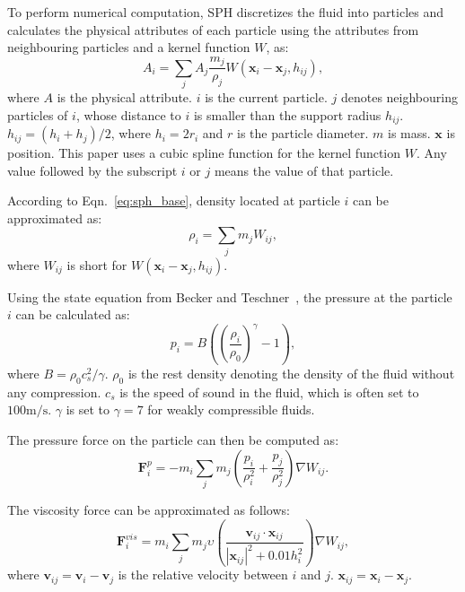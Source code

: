 \documentclass[VANCOUVER,STIX1COL]{WileyNJD-v2}
\begin{document}
To perform numerical computation, SPH discretizes the fluid into particles and calculates the physical attributes of each particle using the attributes from neighbouring particles and a kernel function $W$, as:
\begin{equation}
    A_i = \sum_j A_j \frac{m_j}{\rho_j} W(\mathbf{x}_i - \mathbf{x}_j, h_{ij}),
    \label{eq:sph_base}
\end{equation}
where $A$ is the physical attribute. $i$ is the current particle. $j$ denotes neighbouring particles of $i$, whose distance to $i$ is smaller than the support radius $h_{ij}$. $h_{ij} = (h_i + h_j) / 2$, where $h_i = 2r_i$ and $r$ is the particle diameter. $m$ is mass. $\mathbf{x}$ is position. This paper uses a cubic spline function for the kernel function $W$. Any value followed by the subscript $i$ or $j$ means the value of that particle.

According to Eqn.~\ref{eq:sph_base}, density located at particle $i$ can be approximated as:
\begin{equation}
    \rho_i = \sum_j m_j W_{ij},
    \label{eq:sph_density}
\end{equation}
where $W_{ij}$ is short for $W(\mathbf{x}_i - \mathbf{x}_j, h_{ij})$.

Using the state equation from Becker and Teschner~\cite{Becker07}, the pressure at the particle $i$ can be calculated as:
\begin{equation}
    p_i = B\left(\left(\frac{\rho_i}{\rho_0}\right)^\gamma - 1\right),
\end{equation}
where $B = \rho_0 c_s^2 / \gamma$. $\rho_0$ is the rest density denoting the density of the fluid without any compression. $c_s$ is the speed of sound in the fluid, which is often set to $100\textrm{m}/\textrm{s}$. $\gamma$ is set to $\gamma = 7$ for weakly compressible fluids.

The pressure force on the particle can then be computed as:
\begin{equation}
    \mathbf{F}_i^p = -m_i \sum_j m_j \left(
    \frac{p_i}{\rho_i^2} + \frac{p_j}{\rho_j^2}
    \right)\nabla W_{ij}.
\end{equation}

The viscosity force can be approximated as follows:
\begin{equation}
    \mathbf{F}_i^{vis} = 
    m_i \sum_j m_j \upsilon \left(\frac{\mathbf{v}_{ij}\cdot\mathbf{x}_{ij}}{|\mathbf{x}_{ij}|^2 + 0.01h_i^2}\right)\nabla W_{ij},
    \label{eq:vis}
\end{equation}
where $\mathbf{v}_{ij} = \mathbf{v}_i - \mathbf{v}_j$ is the relative velocity between $i$ and $j$. $\mathbf{x}_{ij} = \mathbf{x}_i - \mathbf{x}_j$.
\end{document}
